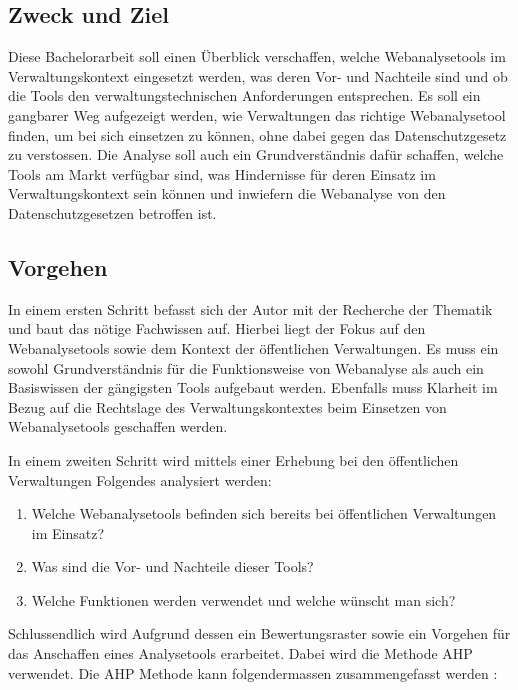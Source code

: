 \subsection{Zweck und Ziel}
Diese Bachelorarbeit soll einen Überblick verschaffen, welche Webanalysetools im Verwaltungskontext eingesetzt werden, was deren Vor- und Nachteile sind und ob die Tools den verwaltungstechnischen Anforderungen entsprechen. Es soll ein gangbarer Weg aufgezeigt werden, wie Verwaltungen das richtige Webanalysetool finden, um bei sich einsetzen zu können, ohne dabei gegen das Datenschutzgesetz zu verstossen. Die Analyse soll auch ein Grundverständnis dafür schaffen, welche Tools am Markt verfügbar sind, was Hindernisse für deren Einsatz im Verwaltungskontext sein können und inwiefern die Webanalyse von den Datenschutzgesetzen betroffen ist.


\subsection{Vorgehen}

In einem ersten Schritt befasst sich der Autor mit der Recherche der Thematik und baut das nötige Fachwissen auf. Hierbei liegt der Fokus auf den Webanalysetools sowie dem Kontext der öffentlichen Verwaltungen. Es muss ein sowohl Grundverständnis für die Funktionsweise von Webanalyse als auch ein Basiswissen der gängigsten Tools aufgebaut werden. Ebenfalls muss Klarheit im Bezug auf die Rechtslage des Verwaltungskontextes beim Einsetzen von Webanalysetools geschaffen werden. 

In einem zweiten Schritt wird mittels einer Erhebung bei den öffentlichen Verwaltungen Folgendes analysiert werden:

\begin{enumerate}
    \item Welche Webanalysetools befinden sich bereits bei öffentlichen Verwaltungen im Einsatz?
    \item Was sind die Vor- und Nachteile dieser Tools?
    \item Welche Funktionen werden verwendet und welche wünscht man sich?
\end{enumerate}

Schlussendlich wird Aufgrund dessen ein Bewertungsraster sowie ein Vorgehen für das Anschaffen eines Analysetools erarbeitet. Dabei wird die Methode AHP verwendet. 
Die AHP Methode kann folgendermassen zusammengefasst werden \parencite[S. 176]{nakatani2011toolselectionmethod}:

